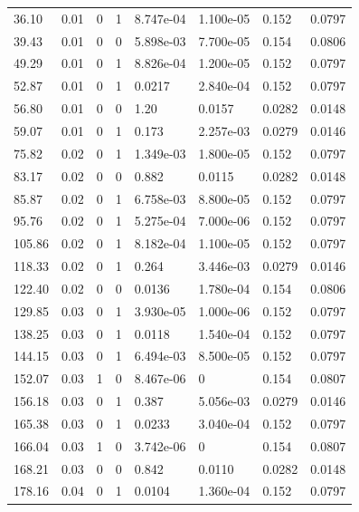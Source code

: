 \documentclass[preview]{standalone}
\begin{document}
{{\begin{tabular}{L{1.2cm}C{1.2cm} C{0.3cm}C{0.5cm} C{1.4cm}C{1.4cm} C{1.4cm}C{1.4cm}}
  36.10  &  0.01  & 0     &  1 &  8.747e-04  & 1.100e-05  & 0.152 &  0.0797   \\ 
  39.43  &  0.01  & 0     &  0 &  5.898e-03  & 7.700e-05  & 0.154 &  0.0806   \\ 
  49.29  &  0.01  & 0     &  1 &  8.826e-04  & 1.200e-05  & 0.152 &  0.0797   \\ 
  52.87  &  0.01  & 0     &  1 &  0.0217  & 2.840e-04  & 0.152 &  0.0797   \\ 
  56.80  &  0.01  & 0     &  0 &  1.20  & 0.0157  & 0.0282 &  0.0148   \\ 
  59.07  &  0.01  & 0     &  1 &  0.173  & 2.257e-03  & 0.0279 &  0.0146   \\ 
  75.82  &  0.02  & 0     &  1 &  1.349e-03  & 1.800e-05  & 0.152 &  0.0797   \\ 
  83.17  &  0.02  & 0     &  0 &  0.882  & 0.0115  & 0.0282 &  0.0148   \\ 
  85.87  &  0.02  & 0     &  1 &  6.758e-03  & 8.800e-05  & 0.152 &  0.0797   \\ 
  95.76  &  0.02  & 0     &  1 &  5.275e-04  & 7.000e-06  & 0.152 &  0.0797   \\ 
  105.86  &  0.02  & 0     &  1 &  8.182e-04  & 1.100e-05  & 0.152 &  0.0797   \\ 
  118.33  &  0.02  & 0     &  1 &  0.264  & 3.446e-03  & 0.0279 &  0.0146   \\ 
  122.40  &  0.02  & 0     &  0 &  0.0136  & 1.780e-04  & 0.154 &  0.0806   \\ 
  129.85  &  0.03  & 0     &  1 &  3.930e-05  & 1.000e-06  & 0.152 &  0.0797   \\ 
  138.25  &  0.03  & 0     &  1 &  0.0118  & 1.540e-04  & 0.152 &  0.0797   \\ 
  144.15  &  0.03  & 0     &  1 &  6.494e-03  & 8.500e-05  & 0.152 &  0.0797   \\ 
  152.07  &  0.03  & 1     &  0 &  8.467e-06  & 0  & 0.154 &  0.0807   \\ 
  156.18  &  0.03  & 0     &  1 &  0.387  & 5.056e-03  & 0.0279 &  0.0146   \\ 
  165.38  &  0.03  & 0     &  1 &  0.0233  & 3.040e-04  & 0.152 &  0.0797   \\ 
  166.04  &  0.03  & 1     &  0 &  3.742e-06  & 0  & 0.154 &  0.0807   \\ 
  168.21  &  0.03  & 0     &  0 &  0.842  & 0.0110  & 0.0282 &  0.0148   \\ 
  178.16  &  0.04  & 0     &  1 &  0.0104  & 1.360e-04  & 0.152 &  0.0797   \\ 

\end{tabular}}}
\end{document}
